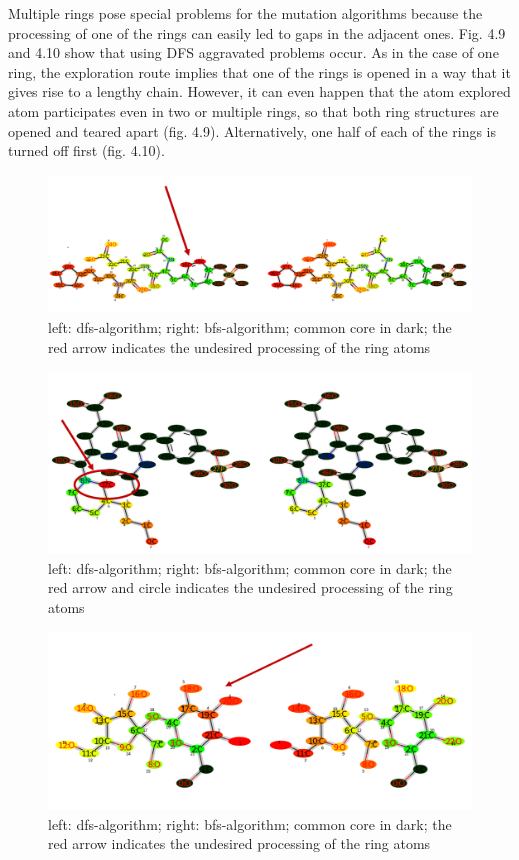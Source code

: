 Multiple rings pose special problems for the mutation algorithms because
the processing of one of the rings can easily led to gaps in the adjacent
ones. Fig. 4.9 and 4.10 show that using DFS aggravated problems occur.
As in the case of one ring, the exploration route implies that one
of the rings is opened in a way that it gives rise to a lengthy chain.
However, it can even happen that the atom explored atom participates
even in two or multiple rings, so that both ring structures are opened
and teared apart (fig. 4.9). Alternatively, one half of each of the
rings is turned off first (fig. 4.10). 

\begin{figure}
\includegraphics[scale=0.4]{simple_ring_exampledfs2}\caption{left: dfs-algorithm; right: bfs-algorithm; common core in dark; the
red arrow indicates the undesired processing of the ring atoms}

\end{figure}

\begin{figure}
\includegraphics[scale=0.4]{simple_ring_exampledfs3}\caption{left: dfs-algorithm; right: bfs-algorithm; common core in dark; the
red arrow and circle indicates the undesired processing of the ring
atoms}

\end{figure}
\begin{figure}

\includegraphics[scale=0.4]{simple_ring_exampledfs4}\caption{left: dfs-algorithm; right: bfs-algorithm; common core in dark; the
red arrow indicates the undesired processing of the ring atoms}

\end{figure}

